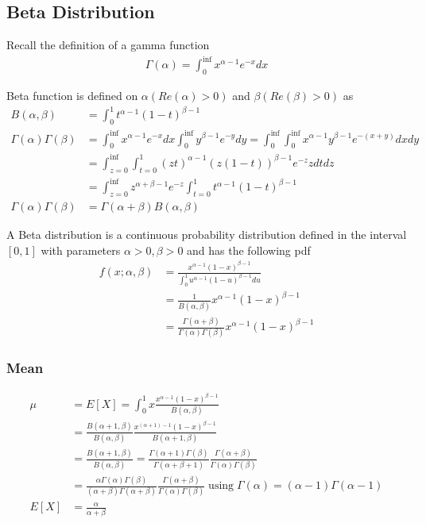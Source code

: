 \documentclass[../../probability-notes.tex]{subfiles}
\begin{document}
    \subsection{Beta Distribution}
    Recall the definition of a gamma function
    \begin{align*}
        \Gamma(\alpha) = \int_{0}^{\inf} x^{\alpha - 1}e^{-x}dx
    \end{align*}

    Beta function is defined on $\alpha (Re(\alpha) > 0)$ and $\beta (Re(\beta) > 0)$ as
    \begin{align*}
        B(\alpha, \beta) &= \int_{0}^{1} t^{\alpha-1} (1-t)^{\beta - 1}\\
        \Gamma(\alpha)\Gamma(\beta) &= \int_{0}^{\inf} x^{\alpha - 1}e^{-x}dx \int_{0}^{\inf} y^{\beta - 1}e^{-y}dy = \int_{0}^{\inf}\int_{0}^{\inf}x^{\alpha - 1}y^{\beta - 1}e^{-(x+y)} dxdy\\
        &= \int_{z=0}^{\inf}\int_{t=0}^{1} (zt)^{\alpha - 1} (z(1-t))^{\beta - 1} e^{-z} zdtdz\\
        &= \int_{z=0}^{\inf} z^{\alpha + \beta - 1} e^{-z} \int_{t=0}^{1} t^{\alpha - 1} (1-t)^{\beta - 1}\\
        \Gamma(\alpha)\Gamma(\beta) &= \Gamma(\alpha+\beta) B(\alpha, \beta)
    \end{align*}

    A Beta distribution is a continuous probability distribution defined in the interval $[0,1]$ with parameters $\alpha >0, \beta >0$ and has the following pdf
    \begin{align*}
        f(x;\alpha, \beta) &= \frac{x^{\alpha - 1}(1-x)^{\beta - 1}}{\int_{0}^{1} u^{\alpha - 1}(1-u)^{\beta - 1} du}\\
        &= \frac{1}{B(\alpha, \beta)} x^{\alpha - 1}(1-x)^{\beta - 1}\\
        &= \frac{\Gamma(\alpha+\beta)}{\Gamma(\alpha)\Gamma(\beta)} x^{\alpha - 1}(1-x)^{\beta - 1}
    \end{align*}

    \subsubsection{Mean}
    \begin{align*}
        \mu &= E[X] = \int_{0}^{1} x \frac{x^{\alpha - 1}(1-x)^{\beta - 1}}{B(\alpha, \beta)}\\
        &= \frac{B(\alpha+1, \beta)}{B(\alpha, \beta)} \frac{x^{(\alpha + 1)-1}(1-x)^{\beta - 1}}{B(\alpha+1, \beta)}\\
        &= \frac{B(\alpha+1, \beta)}{B(\alpha, \beta)} = \frac{\Gamma(\alpha+1)\Gamma(\beta)}{\Gamma(\alpha+\beta+1)} \frac{\Gamma(\alpha+\beta)}{\Gamma(\alpha)\Gamma(\beta)}\\
        &= \frac{\alpha \Gamma(\alpha) \Gamma(\beta)}{(\alpha+\beta)\Gamma(\alpha+\beta)}  \frac{\Gamma(\alpha+\beta)}{\Gamma(\alpha)\Gamma(\beta)} \; \text{using}\; \Gamma(\alpha)=(\alpha - 1) \Gamma (\alpha - 1)\\
        E[X] &= \frac{\alpha}{\alpha + \beta}
    \end{align*}
\end{document}

